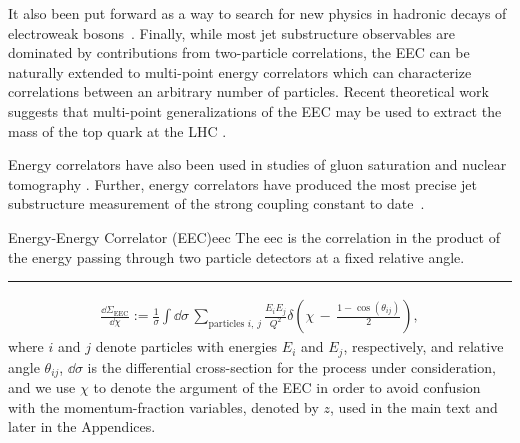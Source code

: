 %
It also been put forward as a way to search for new physics in hadronic decays of electroweak bosons~\cite{Ricci:2022htc}.
%
Finally, while most jet substructure observables are dominated by contributions from two-particle correlations, the EEC can be naturally extended to multi-point energy correlators which can characterize correlations between an arbitrary number of particles.
%
Recent theoretical work suggests that multi-point generalizations of the EEC may be used to extract the mass of the top quark at the LHC \cite{Procura:2022fid,Holguin:2022epo,Holguin:2023bjf,Pathak:2023tmy,Xiao:2024rol,Holguin:2024tkz}.


Energy correlators have also been used in studies of gluon saturation and nuclear tomography  \cite{Karapetyan:2019fst,Liu:2022wop,Liu:2023aqb,Kang:2023gvg,Cao:2023oef}.
%
Further, energy correlators have produced the most precise jet substructure measurement of the strong coupling constant to date~\cite{CMS:2024mlf}.



\begin{definitionbox}{Energy-Energy Correlator (EEC)}{eec}
    The \gls{eec} is the correlation in the product of the energy passing through two particle detectors at a fixed relative angle.

    \vspace{7pt}
    \hrule
    \vspace{7pt}


    \begin{align}
        \label{eq:app:EEC:def}
        \frac{\dd \Sigma_\text{EEC}}{\dd \chi}
        :=
        \frac{1}{\sigma}
        \int \dd \sigma
        \,
        \sum_{\text{particles } i,\,j}
        \frac{E_i E_j}{Q^2}
        \delta\left(\chi \, - \, \frac{1-\cos(\theta_{ij})}{2}\right)
        ,
    \end{align}
    where \(i\) and \(j\) denote particles with energies \(E_i\) and \(E_j\), respectively, and relative angle \(\theta_{ij}\), \(\dd\sigma\) is the differential cross-section for the process under consideration, and we use \(\chi\) to denote the argument of the EEC in order to avoid confusion with the momentum-fraction variables, denoted by \(z\), used in the main text and later in the Appendices.
\end{definitionbox}

